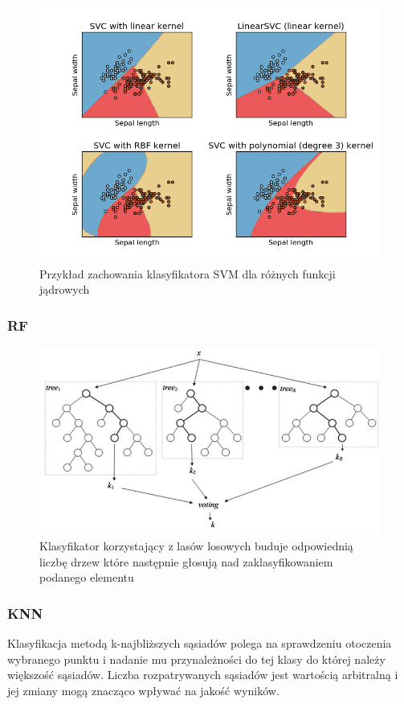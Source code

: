 \documentclass[a4paper]{report}
\begin{document}
\begin{figure}[!htp]
	\centering
	\includegraphics[scale=0.6]{svm.png}
	\caption{Przykład zachowania klasyfikatora SVM dla różnych funkcji jądrowych}
	\label{svmfigure}
\end{figure}


\subsubsection{RF}

\begin{figure}[!htp]
	\centering
	\includegraphics[scale=2.0]{rf.jpg}
	\caption{Klasyfikator korzystający z lasów losowych buduje odpowiednią liczbę drzew które następnie głosują nad zaklasyfikowaniem podanego elementu}
	\label{rffigure}
\end{figure}

\subsubsection{KNN}
Klasyfikacja metodą k-najbliższych sąsiadów polega na sprawdzeniu otoczenia wybranego punktu i nadanie mu przynależności do tej klasy do której należy większość sąsiadów. Liczba rozpatrywanych sąsiadów jest wartością arbitralną i jej zmiany mogą znacząco wpływać na jakość wyników.
\end{document}
